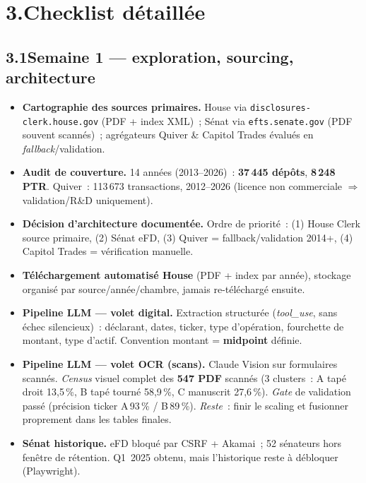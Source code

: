 \documentclass[11pt,a4paper]{article}
\newcommand{\file}[1]{\texttt{\small #1}}
\newcommand{\nb}[1]{\textbf{#1}}
\newcommand{\badge}[2]{\colorbox{#1}{\textcolor{white}{\scriptsize\textbf{\,#2\,}}}}
\newcommand{\FAIT}{\badge{okgreen}{FAIT}}
\newcommand{\ENCOURS}{\badge{warn}{EN COURS}}
\newcommand{\AFAIRE}{\badge{todo}{\`A FAIRE}}
\begin{document}
\section*{3.\quad Checklist d\'etaill\'ee}

\subsection*{3.1\quad Semaine 1 --- exploration, sourcing, architecture}

\begin{itemize}
\item[\FAIT] \textbf{Cartographie des sources primaires.} House via \file{disclosures-clerk.house.gov}
(PDF + index XML)~; S\'enat via \file{efts.senate.gov} (PDF souvent scann\'es)~; agr\'egateurs Quiver
\& Capitol Trades \'evalu\'es en \emph{fallback}/validation.
\item[\FAIT] \textbf{Audit de couverture.} 14 ann\'ees (2013--2026)~: \nb{37\,445 d\'ep\^ots},
\nb{8\,248 PTR}. Quiver~: 113\,673 transactions, 2012--2026 (licence non commerciale $\Rightarrow$
validation/R\&D uniquement).
\item[\FAIT] \textbf{D\'ecision d'architecture document\'ee.} Ordre de priorit\'e~: (1) House Clerk
source primaire, (2) S\'enat eFD, (3) Quiver = fallback/validation 2014+, (4) Capitol Trades =
v\'erification manuelle.
\item[\FAIT] \textbf{T\'el\'echargement automatis\'e House} (PDF + index par ann\'ee), stockage
organis\'e par source/ann\'ee/chambre, jamais re-t\'el\'echarg\'e ensuite.
\item[\FAIT] \textbf{Pipeline LLM --- volet digital.} Extraction structur\'ee (\emph{tool\_use},
sans \'echec silencieux)~: d\'eclarant, dates, ticker, type d'op\'eration, fourchette de montant,
type d'actif. Convention montant = \nb{midpoint} d\'efinie.
\item[\ENCOURS] \textbf{Pipeline LLM --- volet OCR (scans).} Claude Vision sur formulaires scann\'es.
\emph{Census} visuel complet des \nb{547 PDF} scann\'es (3 clusters~: A tap\'e droit 13,5\,\%,
B tap\'e tourn\'e 58,9\,\%, C manuscrit 27,6\,\%). \emph{Gate} de validation pass\'e (pr\'ecision
ticker A\,93\,\% / B\,89\,\%). \textit{Reste}~: finir le scaling et fusionner proprement dans les
tables finales.
\item[\AFAIRE] \textbf{S\'enat historique.} eFD bloqu\'e par CSRF + Akamai~; 52 s\'enateurs hors
fen\^etre de r\'etention. Q1~2025 obtenu, mais l'historique reste \`a d\'ebloquer (Playwright).
\end{itemize}
\end{document}
